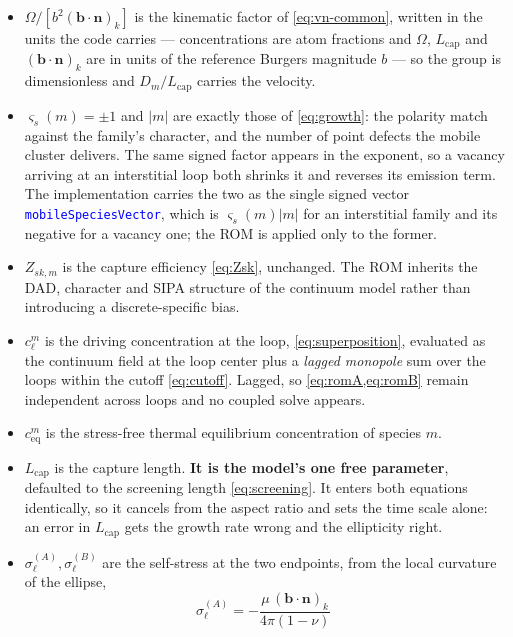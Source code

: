 \documentclass{article}
\newcommand{\textttclr}[1]{\textcolor{blue}{\texttt{#1}}}
\newcommand{\bvec}{\bm b}
\newcommand{\nvec}{\bm n}
\begin{document}
\begin{itemize}
\item $\Omega/[b^{2}(\bvec\!\cdot\!\nvec)_k]$ is the kinematic factor of
      \cref{eq:vn-common}, written in the units the code carries --- concentrations
      are atom fractions and $\Omega$, $L_{\mathrm{cap}}$ and
      $(\bvec\!\cdot\!\nvec)_k$ are in units of the reference Burgers magnitude
      $b$ --- so the group is dimensionless and $D_m/L_{\mathrm{cap}}$ carries the
      velocity.
\item $\varsigma_s(m)=\pm1$ and $|m|$ are exactly those of \cref{eq:growth}: the
      polarity match against the family's character, and the number of point
      defects the mobile cluster delivers. The same signed factor appears in the
      exponent, so a vacancy arriving at an interstitial loop both shrinks it and
      reverses its emission term. The implementation carries the two as the single
      signed vector \textttclr{mobileSpeciesVector}, which is
      $\varsigma_s(m)|m|$ for an interstitial family and its negative for a
      vacancy one; the ROM is applied only to the former.
\item $Z_{sk,m}$ is the capture efficiency \cref{eq:Zsk}, unchanged. The ROM
      inherits the DAD, character and SIPA structure of the continuum model
      rather than introducing a discrete-specific bias.
\item $c^m_\ell$ is the driving concentration at the loop,
      \cref{eq:superposition}, evaluated as the continuum field at the loop center
      plus a \emph{lagged monopole} sum over the loops within the cutoff
      \cref{eq:cutoff}. Lagged, so \cref{eq:romA,eq:romB} remain independent
      across loops and no coupled solve appears.
\item $c^{m}_{\mathrm{eq}}$ is the stress-free thermal equilibrium concentration
      of species $m$.
\item $L_{\mathrm{cap}}$ is the capture length. \textbf{It is the model's one free
      parameter}, defaulted to the screening length \cref{eq:screening}. It enters
      both equations identically, so it cancels from the aspect ratio and sets the
      time scale alone: an error in $L_{\mathrm{cap}}$ gets the growth rate wrong
      and the ellipticity right.
\item $\sigma^{(A)}_\ell,\sigma^{(B)}_\ell$ are the self-stress at the two
      endpoints, from the local curvature of the ellipse,
      \begin{equation}
        \sigma^{(A)}_\ell=-\frac{\mu\,(\bvec\!\cdot\!\nvec)_k}{4\pi(1-\nu)}\,

\end{equation}
\end{itemize}
\end{document}

